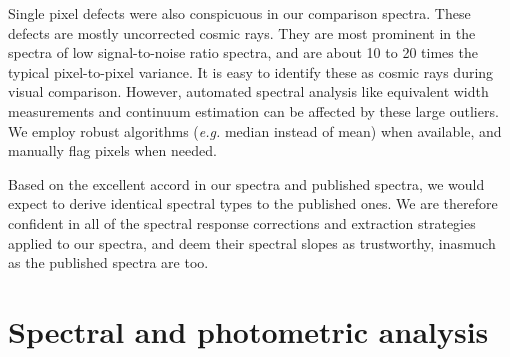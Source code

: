 \documentclass[12pt,preprint]{aastex}
\begin{document}
Single pixel defects were also conspicuous in our comparison spectra.  These defects are mostly uncorrected cosmic rays.  They are most prominent in the spectra of low signal-to-noise ratio spectra, and are about 10 to 20 times the typical pixel-to-pixel variance.  It is easy to identify these as cosmic rays during visual comparison.  However, automated spectral analysis like equivalent width measurements and continuum estimation can be affected by these large outliers.  We employ robust algorithms (\emph{e.g.} median instead of mean) when available, and manually flag pixels when needed.

Based on the excellent accord in our spectra and published spectra, we would expect to derive identical spectral types to the published ones.  We are therefore confident in all of the spectral response corrections and extraction strategies applied to our spectra, and deem their spectral slopes as trustworthy, inasmuch as the published spectra are too.


\section{Spectral and photometric analysis}
\end{document}
